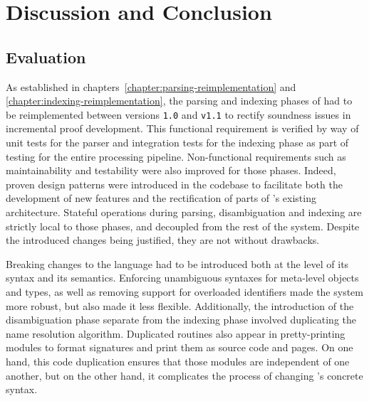 \chapter{Discussion and Conclusion}

\section{Evaluation}

As established in chapters~\ref{chapter:parsing-reimplementation} and \ref{chapter:indexing-reimplementation}, the parsing and indexing phases of \Beluga had to be reimplemented between versions \texttt{1.0} and \texttt{v1.1} to rectify soundness issues in incremental proof development.
This functional requirement is verified by way of unit tests for the parser and integration tests for the indexing phase as part of testing for the entire processing pipeline.
Non-functional requirements such as maintainability and testability were also improved for those phases.
Indeed, proven design patterns were introduced in the codebase to facilitate both the development of new features and the rectification of parts of \Beluga's existing architecture.
Stateful operations during parsing, disambiguation and indexing are strictly local to those phases, and decoupled from the rest of the system.
Despite the introduced changes being justified, they are not without drawbacks.

Breaking changes to the \Beluga language had to be introduced both at the level of its syntax and its semantics.
Enforcing unambiguous syntaxes for meta-level objects and types, as well as removing support for overloaded identifiers made the system more robust, but also made it less flexible.
Additionally, the introduction of the disambiguation phase separate from the indexing phase involved duplicating the name resolution algorithm.
Duplicated routines also appear in pretty-printing modules to format \Beluga signatures and print them as source code and \HTML pages.
On one hand, this code duplication ensures that those modules are independent of one another, but on the other hand, it complicates the process of changing \Beluga's concrete syntax.

